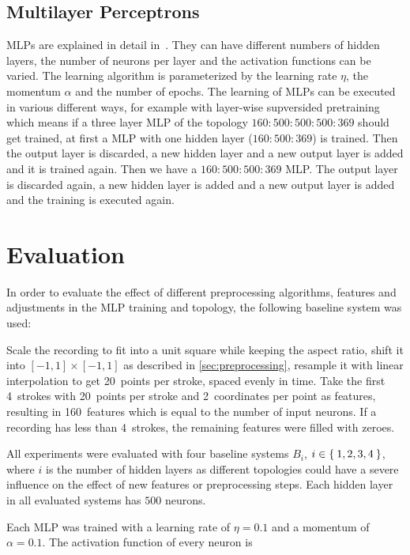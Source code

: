 \documentclass[9pt,technote]{IEEEtran}
\begin{document}
\subsection{Multilayer Perceptrons}\label{sec:mlp-training}
\Glspl{MLP} are explained in detail in~\cite{Mitchell97}. They can have
different numbers of hidden layers, the number of neurons per layer and the
activation functions can be varied. The learning algorithm is parameterized by
the learning rate $\eta$, the momentum $\alpha$ and the number of epochs. The
learning of \glspl{MLP} can be executed in various different ways, for example
with layer-wise supversided pretraining which means if a three layer \gls{MLP}
of the topology $160:500:500:500:369$ should get trained, at first a \gls{MLP}
with one hidden layer ($160:500:369$) is trained. Then the output layer is
discarded, a new hidden layer and a new output layer is added and it is trained
again. Then we have a $160:500:500:369$ \gls{MLP}. The output layer is
discarded again, a new hidden layer is added and a new output layer is added
and the training is executed again.

\section{Evaluation}\label{ch:Evaluation}
In order to evaluate the effect of different preprocessing algorithms, features
and adjustments in the \gls{MLP} training and topology, the following baseline
system was used:

Scale the recording to fit into a unit square while keeping the aspect ratio,
shift it into $[-1,1] \times [-1,1]$ as described in \cref{sec:preprocessing},
resample it with linear interpolation to get 20~points per stroke, spaced
evenly in time. Take the first 4~strokes with 20~points per stroke and
2~coordinates per point as features, resulting in 160~features which is equal
to the number of input neurons. If a recording has less than 4~strokes, the
remaining features were filled with zeroes.

All experiments were evaluated with four baseline systems $B_i$, $i \in \Set{1,
2, 3, 4}$, where $i$ is the number of hidden layers as different topologies
could have a severe influence on the effect of new features or preprocessing
steps. Each hidden layer in all evaluated systems has $500$ neurons.

Each \gls{MLP} was trained with a learning rate of $\eta = 0.1$ and a momentum
of $\alpha = 0.1$. The activation function of every neuron is 
\end{document}
